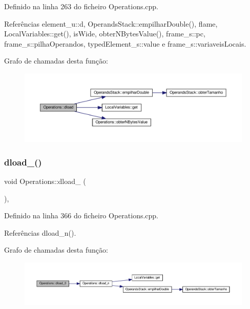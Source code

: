 Definido na linha 263 do ficheiro Operations.\+cpp.



Referências element\+\_\+u\+::d, Operands\+Stack\+::empilhar\+Double(), flame, Local\+Variables\+::get(), is\+Wide, obter\+N\+Bytes\+Value(), frame\+\_\+s\+::pc, frame\+\_\+s\+::pilha\+Operandos, typed\+Element\+\_\+s\+::value e frame\+\_\+s\+::variaveis\+Locais.

Grafo de chamadas desta função\+:
\nopagebreak
\begin{figure}[H]
\begin{center}
\leavevmode
\includegraphics[width=350pt]{classOperations_af53b0b32da7737741c20b4e313eaac84_cgraph}
\end{center}
\end{figure}
\mbox{\label{classOperations_a176a81199439e0b22d206c72ea4a1fba}} 
\subsubsection{\texorpdfstring{dload\+\_()}{dload\_0()}}
{\footnotesize\ttfamily void Operations\+::dload\+\_ (\begin{DoxyParamCaption}{ }\end{DoxyParamCaption})\hspace{0.3cm}{\ttfamily [static]}, {\ttfamily [private]}}



Definido na linha 366 do ficheiro Operations.\+cpp.



Referências dload\+\_\+n().

Grafo de chamadas desta função\+:
\nopagebreak
\begin{figure}[H]
\begin{center}
\leavevmode
\includegraphics[width=350pt]{classOperations_a176a81199439e0b22d206c72ea4a1fba_cgraph}
\end{center}
\end{figure}
\mbox{\label{classOperations_a64632251d88964ff4da0d981103e099c}} 
